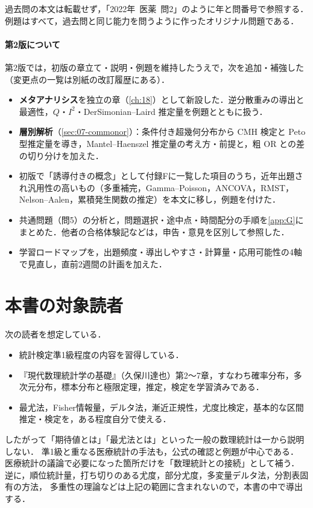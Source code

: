 \documentclass[a4paper,11pt,openany]{ltjsbook}
\newcommand{\kakomon}[2]{\mbox{#1年 医薬 問#2}}
\begin{document}
過去問の本文は転載せず，「\kakomon{2022}{2}」のように年と問番号で参照する．
例題はすべて，過去問と同じ能力を問うように作ったオリジナル問題である．

\paragraph{第2版について}
第2版では，初版の章立て・説明・例題を維持したうえで，次を追加・補強した（変更点の一覧は別紙の改訂履歴にある）．
\begin{itemize}
\item \textbf{メタアナリシス}を独立の章（\cref{ch:18}）として新設した．逆分散重みの導出と最適性，$Q$・$I^2$・DerSimonian--Laird 推定量を例題とともに扱う．
\item \textbf{層別解析}（\cref{sec:07-commonor}）：条件付き超幾何分布から CMH 検定と Peto 型推定量を導き，Mantel--Haenszel 推定量の考え方・前提と，粗 OR との差の切り分けを加えた．
\item 初版で「誘導付きの概念」として付録Fに一覧した項目のうち，近年出題され汎用性の高いもの（多重補完，Gamma--Poisson，ANCOVA，RMST，Nelson--Aalen，累積発生関数の推定）を本文に移し，例題を付けた．
\item 共通問題（問5）の分析と，問題選択・途中点・時間配分の手順を\cref{app:G}にまとめた．他者の合格体験記などは，申告・意見を区別して参照した．
\item 学習ロードマップを，出題頻度・導出しやすさ・計算量・応用可能性の4軸で見直し，直前2週間の計画を加えた．
\end{itemize}

\section*{本書の対象読者}
次の読者を想定している．
\begin{itemize}
\item 統計検定準1級程度の内容を習得している．
\item 『現代数理統計学の基礎』（久保川達也）第2〜7章，すなわち確率分布，多次元分布，標本分布と極限定理，推定，検定を学習済みである．
\item 最尤法，Fisher情報量，デルタ法，漸近正規性，尤度比検定，基本的な区間推定・検定を，ある程度自分で使える．
\end{itemize}
したがって「期待値とは」「最尤法とは」といった一般の数理統計は一から説明しない．
準1級と重なる医療統計の手法も，公式の確認と例題が中心である．
医療統計の議論で必要になった箇所だけを「数理統計との接続」として補う．
逆に，順位統計量，打ち切りのある尤度，部分尤度，多変量デルタ法，分割表固有の方法，
多重性の理論などは上記の範囲に含まれないので，本書の中で導出する．
\end{document}
